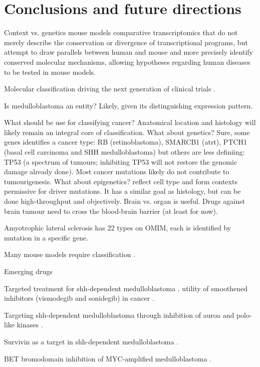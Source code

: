 \chapter{Conclusions and future directions}
\label{ch:conclusion}

Context vs. genetics
mouse models
comparative transcriptomics that do not merely describe the conservation or divergence of transcriptional programs, but attempt to draw parallels between human and mouse and more precisely identify conserved molecular mechanisms, allowing hypotheses regarding human diseases to be tested in mouse models.


Molecular classification driving the next generation of clinical trials .

Is medulloblastoma an entity?
Likely, given its distinguishing expression pattern.

What should be use for classifying cancer?
Anatomical location and histology will likely remain an integral core of classification.
What about genetics? Sure, some genes identifies a cancer type: RB (retinoblastoma), SMARCB1 (\gls{atrt}), PTCH1 (basal cell carcinoma and SHH medulloblastoma) but others are less definiing: TP53 (a spectrum of tumours; inhibiting TP53 will not restore the genomic damage already done). Most cancer mutations likely do not contribute to tumourigenesis.
What about epigenetics? reflect cell type and form contexts permissive for driver mutations. It has a similar goal as histology, but can be done high-throughput and objectively.
Brain vs. organ is useful. Drugs against brain tumour need to cross the blood-brain barrier (at least for now).

Amyotrophic lateral sclerosis has 22 types on OMIM, each is identified by mutation in a specific gene.

Many mouse models require classification .


Emerging drugs

Targeted treatment for \gls{shh}-dependent medulloblastoma .
utility of smoothened inhibitors (vismodegib and sonidegib) in cancer .

Targeting \gls{shh}-dependent medulloblastoma through inhibition of auroa and polo-like kinases .

Survivin as a target in \gls{shh}-dependent medulloblastoma .


BET bromodomain inhibition of MYC-amplified medulloblastoma . 

